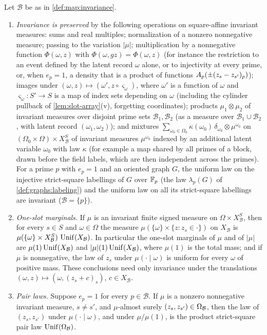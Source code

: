 \begin{lemma}\label{lem:marginals}
Let $\mathcal B$ be as in \cref{def:map:invariance}.
\begin{enumerate}[label=\textup{(\arabic*)}]
\item\label{it:marg:closure} \emph{Invariance is preserved} by the following
 operations on square-affine invariant measures: sums and real multiples;
 normalization of a nonzero nonnegative measure; passing to the variation
 $|\mu|$; multiplication by a nonnegative function $\Phi(\omega,z)$ with
 $\Phi(\omega,gz)=\Phi(\omega,z)$ (for instance the restriction to an event
 defined by the latent record $\omega$ alone, or to injectivity at every
 prime, or, when $e_p=1$, a density that is a product of functions
 $\Ap(\pm(z_s-z_{s'})_p)$); images under $(\omega,z)\mapsto(\omega',z\circ\varsigma_\omega)$,
 where $\omega'$ is a function of $\omega$ and $\varsigma_\omega\colon S'\to S$ is
 a map of index sets depending on $\omega$ (including the
 cylinder pullback of \cref{lem:slot-array}(v), forgetting coordinates);
 products $\mu_1\otimes\mu_2$ of invariant measures over disjoint prime sets
 $\mathcal B_1,\mathcal B_2$ (as a measure over $\mathcal B_1\cup\mathcal B_2$, with
 latent record $(\omega_1,\omega_2)$); and mixtures
 $\sum_{\omega_0\in\Omega_0}\kappa(\omega_0)\,\delta_{\omega_0}\otimes\mu^{\omega_0}$ on
 $(\Omega_0\times\Omega)\times X_{\mathcal B}^S$ of invariant measures
 $\mu^{\omega_0}$ indexed by an additional latent variable $\omega_0$ with law
 $\kappa$ (for example a map shared by all primes of a block, drawn before the
 field labels, which are then independent across the primes). For a prime $p$
 with $e_p=1$ and an oriented graph $G$, the uniform law on the injective
 strict-square labellings of $G$ over $\Fp$ (the law $\lambda_p(G)$ of
 \cref{def:graphs:labeling}) and the uniform law on all its strict-square
 labellings are invariant ($\mathcal B=\{p\}$).
\item\label{it:marg:one} \emph{One-slot marginals.} If $\mu$ is an invariant
 finite signed measure on $\Omega\times X_{\mathcal B}^S$, then for every
 $s\in S$ and $\omega\in\Omega$ the measure $\mu(\{\omega\}\times\{z:z_s\in\cdot\})$
 on $X_{\mathcal B}$ is $\mu(\{\omega\}\times X_{\mathcal B}^S)\,\Unif(X_{\mathcal B})$.
 In particular the one-slot marginals of $\mu$ and of $|\mu|$ are
 $\mu(1)\Unif(X_{\mathcal B})$ and $|\mu|(1)\Unif(X_{\mathcal B})$, where
 $\mu(1)$ is the total mass; and if $\mu$ is nonnegative, the law of $z_s$
 under $\mu(\cdot\mid\omega)$ is uniform for every $\omega$ of positive mass.
 These conclusions need only invariance under the translations
 $(\omega,z)\mapsto(\omega,(z_s+c)_s)$, $c\in X_{\mathcal B}$.
\item\label{it:marg:pair} \emph{Pair laws.} Suppose $e_p=1$ for every
 $p\in\mathcal B$. If $\mu$ is a nonzero nonnegative invariant measure,
 $s\ne s'$, and $\mu$-almost surely $(z_s,z_{s'})\in\Om[\mathcal B]$, then the law
 of $(z_s,z_{s'})$ under $\mu(\cdot\mid\omega)$, and under $\mu/\mu(1)$, is the
 product strict-square pair law $\Unif(\Om[\mathcal B])$.
\end{enumerate}
\end{lemma}

